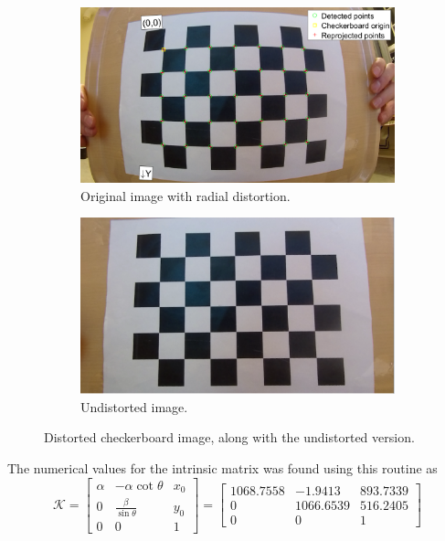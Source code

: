 \begin{figure}[H]
	\centering
	\begin{subfigure}{.5\textwidth}
		\centering
		\includegraphics[width=.8\linewidth]{fig/calibration_distorted.PNG}
		\caption{Original image with radial distortion.}
		\label{fig:sub_distort1}
	\end{subfigure}%
	\begin{subfigure}{.5\textwidth}
		\centering
		\includegraphics[width=.8\linewidth]{fig/calibration_undistorted.PNG}
		\caption{Undistorted image.}
		\label{fig:sub_distort2}
	\end{subfigure}
	\caption{Distorted checkerboard image, along with the undistorted version.}
	\label{fig:distortion}
\end{figure}
The numerical values for the intrinsic matrix was found using this routine as
\begin{equation}
\mathcal{K}=\begin{bmatrix}\alpha & -\alpha\cot{\theta} & x_0\\0 & \frac{\beta}{\sin{\theta}} & y_0\\0 & 0 & 1\end{bmatrix}=\begin{bmatrix}
1068.7558 & -1.9413 & 893.7339 \\ 0 & 1066.6539 &516.2405\\ 0 & 0 & 1
\end{bmatrix}
\end{equation}  
